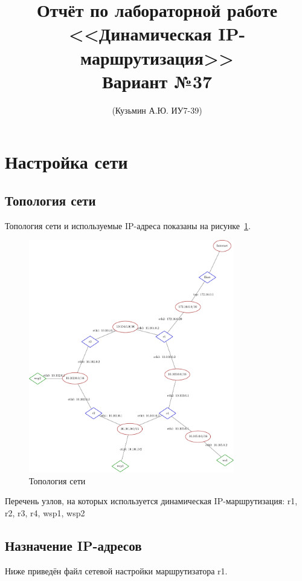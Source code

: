 \documentclass[a4paper,12pt]{article}
\title{Отчёт по лабораторной работе \\ <<Динамическая IP-маршрутизация>> \\ Вариант №37}
\author{(Кузьмин А.Ю. ИУ7-39)}
\begin{document}
\maketitle

\tableofcontents

\section{Настройка сети}

\subsection{Топология сети}

Топология сети и используемые IP-адреса показаны на рисунке~\ref{fig:network}.

\begin{figure}
\centering
\includegraphics[width=0.8\textwidth]{includes/network_gv.pdf}
\caption{Топология сети}
\label{fig:network}
\end{figure}

Перечень узлов, на которых используется динамическая IP-маршрутизация: r1, r2, r3, r4, wsp1, wsp2


\subsection{Назначение IP-адресов}

Ниже приведён файл сетевой настройки  маршрутизатора r1.
\end{document}
